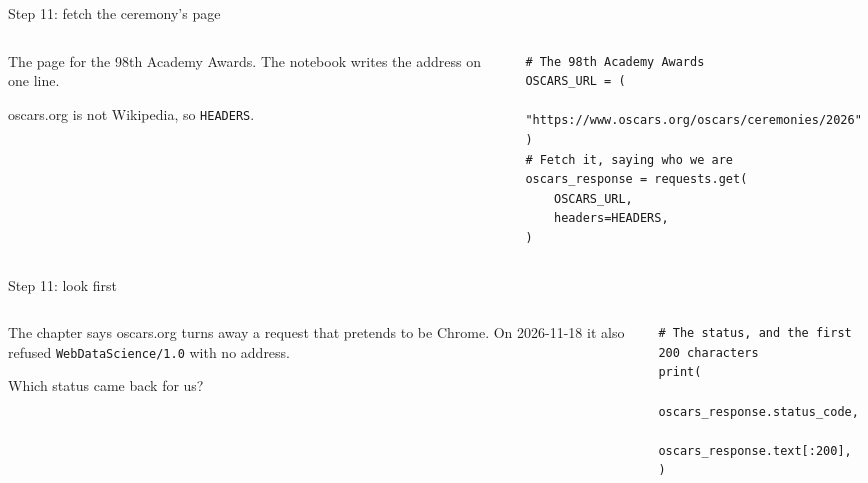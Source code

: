 \documentclass[9pt,aspectratio=169]{beamer}
\begin{document}
\begin{frame}[fragile]{Step 11: fetch the ceremony's page}
    \begin{columns}[T]
        \begin{column}{0.37\textwidth}
            The page for the 98th Academy Awards. The notebook writes the address on one line.

            \medskip
            oscars.org is not Wikipedia, so \texttt{HEADERS}.
        \end{column}
        \begin{column}{0.6\textwidth}
\begin{lstlisting}
# The 98th Academy Awards
OSCARS_URL = (
    "https://www.oscars.org/oscars/ceremonies/2026"
)
# Fetch it, saying who we are
oscars_response = requests.get(
    OSCARS_URL,
    headers=HEADERS,
)
\end{lstlisting}
        \end{column}
    \end{columns}
\end{frame}

\begin{frame}[fragile]{Step 11: look first}
    \begin{columns}[T]
        \begin{column}{0.37\textwidth}
            The chapter says oscars.org turns away a request that pretends to be Chrome. On 2026-11-18 it also refused \texttt{WebDataScience/1.0} with no address.

            \medskip
            Which status came back for us?
        \end{column}
        \begin{column}{0.6\textwidth}
\begin{lstlisting}
# The status, and the first 200 characters
print(
    oscars_response.status_code,
    oscars_response.text[:200],
)
\end{lstlisting}
        \end{column}
    \end{columns}
\end{frame}
\end{document}
